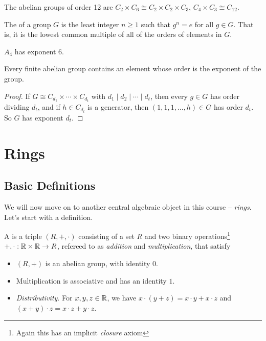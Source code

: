 \documentclass[a4paper]{scrartcl}
\begin{document}
\begin{example}
	The abelian groups of order 12 are $C_{2} \times C_6 \cong C_2 \times C_2 \times C_3$, $C_4 \times C_3 \cong C_{12}$.
\end{example}

\begin{definition}[Exponent]
	The  of a group $G$ is the least integer $n \geq 1$ such that $g^n = e$ for all $g \in G$. That is, it is the lowest common multiple of all of the orders of elements in $G$.
\end{definition}

\begin{example}
	$A_4$ has exponent 6.
\end{example}

\begin{corollary}
	Every finite abelian group contains an element whose order is the exponent of the group.
\end{corollary}
\begin{proof}
	If $G \cong C_{d_1} \times \cdots \times C_{d_t}$ with $d_1 \mid d_2 \mid \cdots \mid d_t$, then every $g \in G$ has order dividing $d_t$, and if $h \in C_{d_t}$ is a generator, then $(1, 1, 1, \dots, h) \in G$ has order $d_t$. So $G$ has exponent $d_t$.
\end{proof}


\section{Rings} 

\subsection{Basic Definitions}



We will now move on to another central algebraic object in this course -- \emph{rings}.
Let's start with a definition.


\begin{definition}[Ring]
	A  is a triple $(R, +, \cdot)$ consisting of a set $R$ and two binary operations\footnote{Again this has an implicit \emph{closure} axiom} $+, \cdot: \mathbb{R} \times \mathbb{R} \rightarrow R$, refereed to as \emph{addition} and \emph{multiplication}, that satisfy
	\begin{itemize}
		\item $(R, +)$ is an abelian group, with identity $0$.
		\item Multiplication is associative and has an identity $1$.
		\item \emph{Distributivity}. For $x, y, z \in \mathbb{R}$, we have $x \cdot (y + z) = x \cdot y + x \cdot z$ and $(x + y)\cdot z = x \cdot z + y \cdot z$.
	\end{itemize}
\end{definition}
\end{document}
